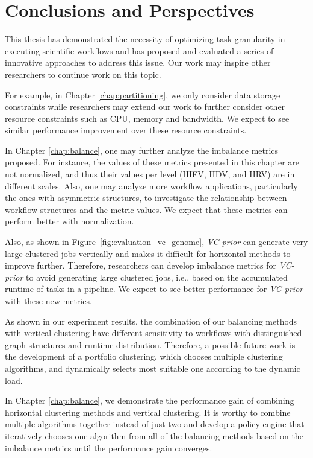 \section{Conclusions and Perspectives}

This thesis has demonstrated the necessity of optimizing task granularity in executing scientific workflows and has proposed and evaluated a series of innovative approaches to address this issue. Our work may inspire other researchers to continue work on this topic.  

For example, in Chapter \ref{chap:partitioning}, we only consider data storage constraints while researchers may extend our work to further consider other resource constraints such as CPU, memory and bandwidth. We expect to see similar performance improvement over these resource constraints. 

In Chapter \ref{chap:balance},  one may further analyze the imbalance metrics proposed. For instance, the values of these metrics presented in this chapter are not normalized, and thus their values per level (HIFV, HDV, and HRV) are in different scales. Also, one may analyze more workflow applications, particularly the ones with asymmetric structures, to investigate the relationship between workflow structures and the metric values. We expect that these metrics can perform better with normalization. 

Also, as shown in Figure~\ref{fig:evaluation_vc_genome}, \emph{VC-prior} can generate very large clustered jobs vertically and makes it difficult for horizontal methods to improve further. Therefore, researchers can develop imbalance metrics for \emph{VC-prior} to avoid generating large clustered jobs, i.e., based on the accumulated runtime of tasks in a pipeline. We expect to see better performance for \emph{VC-prior} with these new metrics. 


As shown in our experiment results, the combination of our balancing methods with vertical clustering have different sensitivity to workflows with distinguished graph structures and runtime distribution. Therefore, a possible future work is the development of a portfolio clustering, which chooses multiple clustering algorithms, and dynamically selects most suitable one according to the dynamic load.

In Chapter \ref{chap:balance}, we demonstrate the performance gain of combining horizontal clustering methods and vertical clustering. It is worthy to combine multiple algorithms together instead of just two and develop a policy engine that iteratively chooses one algorithm from all of the balancing methods based on the imbalance metrics until the performance gain converges. 

